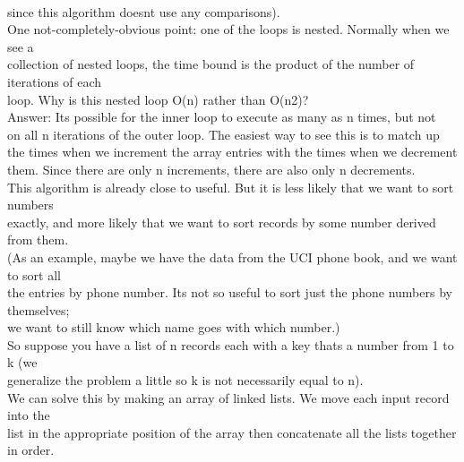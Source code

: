 \documentclass[a4paper,11pt]{article}
\begin{document}
\begin{flushleft}
{\\ }
{
since this algorithm doesnt use any comparisons).
\\ }
{
\raggedleft
One not-completely-obvious point: one of the loops is nested. Normally when we see a
\\ collection of nested loops, the time bound is the product of the number of iterations of each
\\ }
{
loop. Why is this nested loop O(n) rather than O(n2)?
\\ }
{
\raggedleft
Answer: Its possible for the inner loop to execute as many as n times, but not
\\ on all n iterations of the outer loop. The easiest way to see this is to match up
\\ the times when we increment the array entries with the times when we decrement
\\ }
{
them. Since there are only n increments, there are also only n decrements.
\\ }
{
\raggedleft
This algorithm is already close to useful. But it is less likely that we want to sort numbers
\\ exactly, and more likely that we want to sort records by some number derived from them.
\\ (As an example, maybe we have the data from the UCI phone book, and we want to sort all
\\ the entries by phone number. Its not so useful to sort just the phone numbers by themselves;
\\ }
{
we want to still know which name goes with which number.)
\\ }
{
\raggedleft
So suppose you have a list of n records each with a key thats a number from 1 to k (we
\\ }
{
generalize the problem a little so k is not necessarily equal to n).
\\ }
{
\raggedleft
We can solve this by making an array of linked lists. We move each input record into the
\\ }
{
\centering
list in the appropriate position of the array then concatenate all the lists together in order.
}
\end{flushleft}
\newpage
\end{document}
